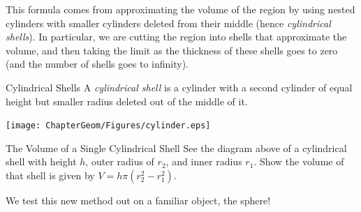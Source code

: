 This formula comes from approximating the volume of the region by using nested cylinders with smaller cylinders deleted from their middle (hence \emph{cylindrical shells}).  In particular, we are cutting the region into shells that approximate the volume, and then taking the limit as the thickness of these shells goes to zero (and the number of shells goes to infinity). 

\begin{definition}{Cylindrical Shells}
 A \emph{cylindrical shell} is a cylinder with a second cylinder of equal height but smaller radius deleted out of the middle of it.
\end{definition}

	\begin{center}
		\texttt{[image: ChapterGeom/Figures/cylinder.eps]}
	\end{center} 

\begin{exercise}{The Volume of a Single Cylindrical Shell \Coffeecup }\label{SingleShell}
  See the diagram above of a cylindrical shell with height $h$, outer radius of $r_2$, and inner radius $r_1$.  Show the volume of that shell is given by $V=h\pi\left( r_2^2-r_1^2\right)$.

\end{exercise}

We test this new method out on a familiar object, the sphere!  


